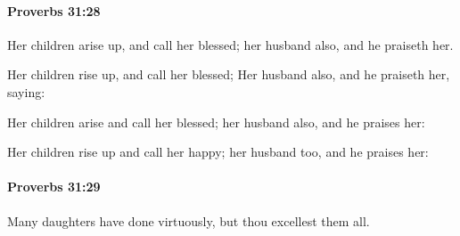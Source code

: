 		\paragraph{Proverbs 31:28} %
			\label{PROVERBS-31-28}

			Her children arise up, and call her blessed; her husband also, and he praiseth her.

			\begin{versebox}
					\item[BHS] 
					\item[ASV] Her children rise up, and call her blessed; Her husband also, and he praiseth her, saying:
					\item[NIV] Her children arise and call her blessed; her husband also, and he praises her:
					\item[NRSV] Her children rise up and call her happy; her husband too, and he praises her:
			\end{versebox}

		\paragraph{Proverbs 31:29} %
			\label{PROVERBS-31-29}

			Many daughters have done virtuously, but thou excellest them all.

